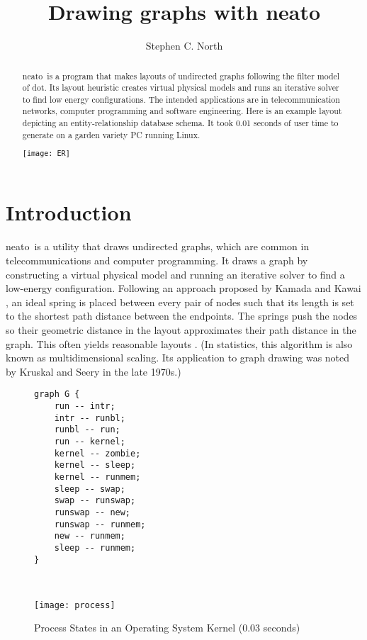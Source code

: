 \documentclass[11pt]{article}
\date{\lastedited}
\def\dot{{\sc dot}}
\def\neato{{\sc neato}}
\begin{document}

\title{Drawing graphs with \neato}
\author{Stephen C. North}
\maketitle
\begin{abstract}
\noindent
\neato\ is a program that makes layouts of undirected graphs
following the filter model of \dot.
Its layout heuristic creates virtual physical models and runs an
iterative solver to find low energy configurations.
The intended applications are in telecommunication networks,
computer programming and software engineering.
Here is an example layout depicting an entity-relationship
database schema.  It took 0.01 seconds of user time to generate
on a garden variety PC running Linux. 
\par
\vspace*{.25in}
\centerline{ \texttt{[image: ER]} }
\end{abstract}

\newpage
\section{Introduction}
\neato\ is a utility that draws undirected graphs,
which are common in telecommunications and computer programming.
It draws a graph by constructing a virtual physical model
and running an iterative solver to find a low-energy configuration.
Following an approach proposed by Kamada and Kawai \cite{kk},
an ideal spring is placed between every pair of nodes such that
its length is set to the shortest path distance between the endpoints.
The springs push the nodes so their geometric distance in the layout
approximates their path distance in the graph.
This often yields reasonable layouts \cite{spremb}\cite{reingold-fructerman}.
(In statistics, this algorithm is also known as multidimensional scaling.
Its application to graph drawing was noted by Kruskal and Seery in the
late 1970s.)
\begin{figure}[b]
\begin{minipage}[b]{2in}
\begin{verbatim}
graph G {
    run -- intr;
    intr -- runbl;
    runbl -- run;
    run -- kernel;
    kernel -- zombie;
    kernel -- sleep;
    kernel -- runmem;
    sleep -- swap;
    swap -- runswap;
    runswap -- new;
    runswap -- runmem;
    new -- runmem;
    sleep -- runmem;
}
\end{verbatim}
\end{minipage} \hspace{.5in} \
\parbox[b]{2.5in}{
	\texttt{[image: process]}
}
\caption{Process States in an Operating System Kernel (0.03 seconds)}
\label{fig:process}
\end{figure}
\end{document}
